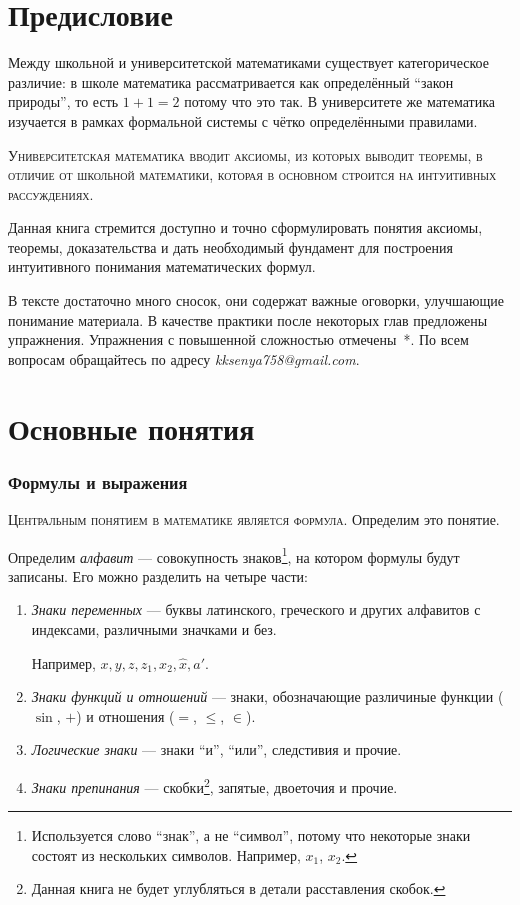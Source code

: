 \part{Предисловие}

Между школьной и университетской математиками существует категорическое
различие: в школе математика рассматривается как определённый ``закон природы'',
то есть $1+1=2$ потому что это так. В университете же математика изучается
в рамках формальной системы с чётко определёнными правилами.

\textsc{Университетская математика вводит аксиомы, из которых выводит теоремы,
в отличие от школьной математики, которая
в основном строится на интуитивных рассуждениях.}

Данная книга стремится доступно и точно сформулировать понятия аксиомы,
теоремы, доказательства и дать необходимый фундамент для построения
интуитивного понимания математических формул.

В тексте достаточно много сносок, они содержат важные оговорки,
улучшающие понимание материала. В качестве практики
после некоторых глав предложены упражнения. Упражнения с повышенной сложностью
отмечены~*.
По всем вопросам обращайтесь по адресу {\sl kksenya758@gmail.com}.

\part{Основные понятия}

\section{Формулы и выражения}

\textsc{Центральным понятием в математике является формула.}
Определим это понятие.

Определим {\it алфавит} --- совокупность знаков\footnote{
	Используется слово ``знак'', а не ``символ'', потому что некоторые знаки
	состоят из нескольких символов. Например, $x_1$, $x_2$.},
на котором формулы будут записаны. Его можно разделить на четыре части:
\begin{enumerate}
	\item{}{\it Знаки переменных} --- буквы латинского,
		греческого и других алфавитов с индексами, различными значками и без.

		Например, $x,y,z,z_1,x_2,\hat x,a'$.

	\item{}{\it Знаки функций и отношений} --- знаки, обозначающие
		различиные функции ($\sin$, $+$) и отношения ($=$, $\leq$, $\in$).

	\item{}{\it Логические знаки} --- знаки ``и'', ``или'', следстивия и прочие.

	\item{}{\it Знаки препинания} --- скобки\footnote{
			Данная книга не будет углубляться в детали расставления скобок.
		}, запятые, двоеточия и прочие.
\end{enumerate}

